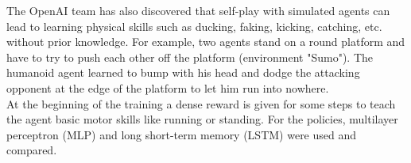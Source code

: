 The OpenAI team has also discovered that self-play with simulated agents can lead to learning physical skills such as ducking, faking, kicking, catching, etc. without prior knowledge. For example, two agents stand on a round platform and have to try to push each other off the platform (environment "Sumo"). The humanoid agent learned to bump with his head and dodge the attacking opponent at the edge of the platform to let him run into nowhere. \\
At the beginning of the training a dense reward  is given for some steps to teach the agent basic motor skills like running or standing. For the policies, multilayer perceptron (MLP) and long short-term memory (LSTM) were used and compared.





